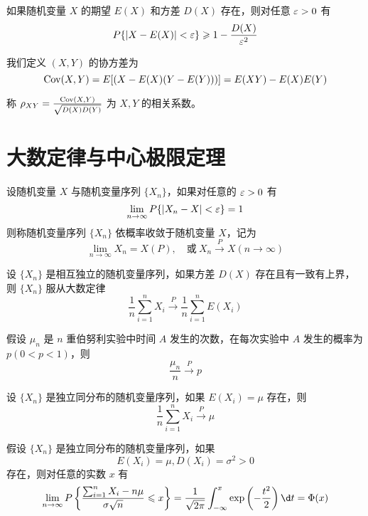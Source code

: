 \begin{theorem}[切比雪夫不等式]
	如果随机变量 $X$ 的期望 $E(X)$ 和方差 $D(X)$ 存在，则对任意 $\varepsilon > 0$ 有
	\[ P\{|X - E(X)| < \varepsilon\} \geqslant 1 - \frac{D(X)}{\varepsilon^2} \]
\end{theorem}

我们定义 $(X, Y)$ 的协方差为
\[ \operatorname{{Cov}}(X, Y) = E[(X - E(X)(Y - E(Y)))] = E(XY) - E(X) E(Y) \]

称 $\rho_{XY} = \frac{\operatorname{{Cov}}(X, Y)}{\sqrt{D(X) D(Y)}}$ 为 $X, Y$ 的相关系数。

\section{大数定律与中心极限定理}

设随机变量 $X$ 与随机变量序列 $\{X_n\}$，如果对任意的 $\varepsilon > 0$ 有
\[ \lim_{n \to \infty} P\{|X_n - X| < \varepsilon \} =1 \]
则称随机变量序列 $\{X_n\}$ 依概率收敛于随机变量 $X$，记为
\[ \lim_{n \to \infty} X_n = X(P), \quad \text{或}\ X_n \stackrel{P}{\longrightarrow} X(n \to \infty) \]

\begin{theorem}[切比雪夫大数定律]
	设 $\{X_n\}$ 是相互独立的随机变量序列，如果方差 $D(X)$ 存在且有一致有上界，则 $\{X_n\}$ 服从大数定律
	\[ \frac{1}{n} \sum_{i=1}^n X_i \stackrel{P}{\longrightarrow} \frac{1}{n} \sum_{i=1}^n E(X_i) \]
\end{theorem}

\begin{theorem}[伯努利大数定律]
	假设 $\mu_n$ 是 $n$ 重伯努利实验中时间 $A$ 发生的次数，在每次实验中 $A$ 发生的概率为 $p(0 < p < 1)$，则
	\[ \frac{\mu_n}{n} \stackrel{P}{\longrightarrow} p \]
\end{theorem}

\begin{theorem}[辛钦大数定律]
	设 $\{X_n\}$ 是独立同分布的随机变量序列，如果 $E(X_i) = \mu$ 存在，则
	\[ \frac{1}{n} \sum_{i=1}^n X_i \stackrel{P}{\longrightarrow} \mu \]
\end{theorem}

\begin{theorem}[列维 - 林德伯格定理]
	假设 $\{X_n\}$ 是独立同分布的随机变量序列，如果
	\[ E(X_i) = \mu, D(X_i) = \sigma^2 > 0 \]
	存在，则对任意的实数 $x$ 有
	\[ \lim_{n \to \infty} P\left\{ \frac{\sum_{i=1}^n X_i - n \mu}{\sigma \sqrt{n}} \leqslant x \right\} = \frac{1}{\sqrt{2 \pi}} \int_{-\infty}^x \exp\left(-\frac{t^2}{2}\right) \d t = \Phi(x)  \]
\end{theorem}

